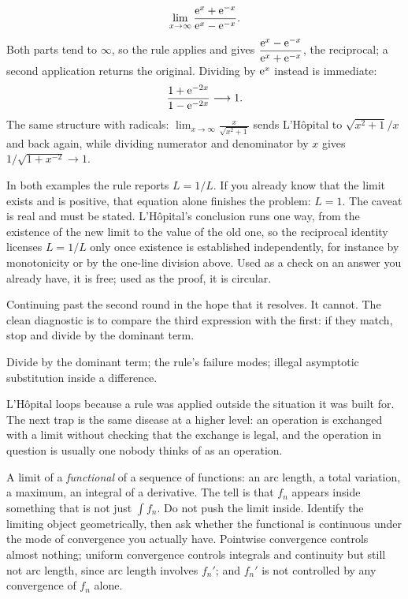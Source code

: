 \begin{worked}
\[\lim_{x\to\infty}\frac{\mathrm{e}^{x}+\mathrm{e}^{-x}}{\mathrm{e}^{x}-\mathrm{e}^{-x}} .\]
Both parts tend to $\infty$, so the rule applies and gives $\dfrac{\mathrm{e}^{x}-\mathrm{e}^{-x}}{\mathrm{e}^{x}+\mathrm{e}^{-x}}$, the reciprocal; a second application returns the original. Dividing by $\mathrm{e}^{x}$ instead is immediate:
\[\frac{1+\mathrm{e}^{-2x}}{1-\mathrm{e}^{-2x}}\longrightarrow 1 .\]
The same structure with radicals: $\displaystyle\lim_{x\to\infty}\frac{x}{\sqrt{x^{2}+1}}$ sends L'H\^opital to $\sqrt{x^{2}+1}/x$ and back again, while dividing numerator and denominator by $x$ gives $1/\sqrt{1+x^{-2}}\to1$.
\end{worked}

\begin{keynote}
In both examples the rule reports $L=1/L$. If you already know that the limit exists and is positive, that equation alone finishes the problem: $L=1$. The caveat is real and must be stated. L'H\^opital's conclusion runs one way, from the existence of the new limit to the value of the old one, so the reciprocal identity licenses $L=1/L$ only once existence is established independently, for instance by monotonicity or by the one-line division above. Used as a check on an answer you already have, it is free; used as the proof, it is circular.
\end{keynote}

\begin{trap}
Continuing past the second round in the hope that it resolves. It cannot. The clean diagnostic is to compare the third expression with the first: if they match, stop and divide by the dominant term.
\end{trap}

\begin{seealsob}Divide by the dominant term; the rule's failure modes; illegal asymptotic substitution inside a difference.\end{seealsob}

L'H\^opital loops because a rule was applied outside the situation it was built for. The next trap is the same disease at a higher level: an operation is exchanged with a limit without checking that the exchange is legal, and the operation in question is usually one nobody thinks of as an operation.

\cue A limit of a \emph{functional} of a sequence of functions: an arc length, a total variation, a maximum, an integral of a derivative. The tell is that $f_n$ appears inside something that is not just $\int f_n$.
\method Do not push the limit inside. Identify the limiting object geometrically, then ask whether the functional is continuous under the mode of convergence you actually have. Pointwise convergence controls almost nothing; uniform convergence controls integrals and continuity but still not arc length, since arc length involves $f_n'$; and $f_n'$ is not controlled by any convergence of $f_n$ alone.

